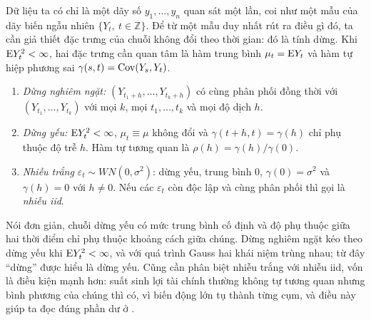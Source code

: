Dữ liệu ta có chỉ là một dãy số $y_1,\dots,y_n$ quan sát một lần, coi như một mẫu của dãy biến ngẫu nhiên $\{Y_t,\ t\in\mathbb Z\}$. Để từ một mẫu duy nhất rút ra điều gì đó, ta cần giả thiết đặc trưng của chuỗi không đổi theo thời gian: đó là tính dừng. Khi $\mathrm{E} Y_t^2<\infty$, hai đặc trưng cần quan tâm là hàm trung bình $\mu_t=\mathrm{E} Y_t$ và hàm tự hiệp phương sai $\gamma(s,t)=\operatorname{Cov}(Y_s,Y_t)$.
\begin{kq}
\begin{enumerate}[label=(\roman*),leftmargin=*,itemsep=1pt]
\item \emph{Dừng nghiêm ngặt:} $(Y_{t_1+h},\dots,Y_{t_k+h})$ có cùng phân phối đồng thời với $(Y_{t_1},\dots,Y_{t_k})$ với mọi $k$, mọi $t_1,\dots,t_k$ và mọi độ dịch $h$.
\item \emph{Dừng yếu:} $\mathrm{E} Y_t^2<\infty$, $\mu_t\equiv\mu$ không đổi và $\gamma(t+h,t)=\gamma(h)$ chỉ phụ thuộc độ trễ $h$. Hàm tự tương quan là $\rho(h)=\gamma(h)/\gamma(0)$.
\item \emph{Nhiễu trắng} $\varepsilon_t\sim WN(0,\sigma^2)$: dừng yếu, trung bình $0$, $\gamma(0)=\sigma^2$ và $\gamma(h)=0$ với $h\neq0$. Nếu các $\varepsilon_t$ còn độc lập và cùng phân phối thì gọi là \emph{nhiễu iid}.
\end{enumerate}
\end{kq}
Nói đơn giản, chuỗi dừng yếu có mức trung bình cố định và độ phụ thuộc giữa hai thời điểm chỉ phụ thuộc khoảng cách giữa chúng. Dừng nghiêm ngặt kéo theo dừng yếu khi $\mathrm{E} Y_t^2<\infty$, và với quá trình Gauss hai khái niệm trùng nhau; từ đây ``dừng'' được hiểu là dừng yếu. Cũng cần phân biệt nhiễu trắng với nhiễu iid, vốn là điều kiện mạnh hơn: suất sinh lợi tài chính thường không tự tương quan nhưng bình phương của chúng thì có, vì biến động lớn tụ thành từng cụm, và điều này giúp ta đọc đúng phần dư ở .


